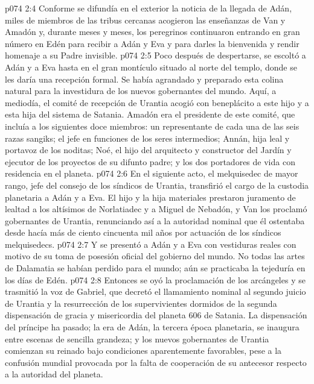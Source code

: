 \vs p074 2:4 \pc Conforme se difundía en el exterior la noticia de la llegada de Adán, miles de miembros de las tribus cercanas acogieron las enseñanzas de Van y Amadón y, durante meses y meses, los peregrinos continuaron entrando en gran número en Edén para recibir a Adán y Eva y para darles la bienvenida y rendir homenaje a su Padre invisible.
\vs p074 2:5 \pc Poco después de despertarse, se escoltó a Adán y a Eva hasta en el gran montículo situado al norte del templo, donde se les daría una recepción formal. Se había agrandado y preparado esta colina natural para la investidura de los nuevos gobernantes del mundo. Aquí, a mediodía, el comité de recepción de Urantia acogió con beneplácito a este hijo y a esta hija del sistema de Satania. Amadón era el presidente de este comité, que incluía a los siguientes doce miembros: un representante de cada una de las seis razas sangiks; el jefe en funciones de los seres intermedios; Annán, hija leal y portavoz de los noditas; Noé, el hijo del arquitecto y constructor del Jardín y ejecutor de los proyectos de su difunto padre; y los dos portadores de vida con residencia en el planeta.
\vs p074 2:6 En el siguiente acto, el melquisedec de mayor rango, jefe del consejo de los síndicos de Urantia, transfirió el cargo de la custodia planetaria a Adán y a Eva. El hijo y la hija materiales prestaron juramento de lealtad a los altísimos de Norlatiadec y a Miguel de Nebadón, y Van los proclamó gobernantes de Urantia, renunciando así a la autoridad nominal que él ostentaba desde hacía más de ciento cincuenta mil años por actuación de los síndicos melquisedecs.
\vs p074 2:7 Y se presentó a Adán y a Eva con vestiduras reales con motivo de su toma de posesión oficial del gobierno del mundo. No todas las artes de Dalamatia se habían perdido para el mundo; aún se practicaba la tejeduría en los días de Edén.
\vs p074 2:8 Entonces se oyó la proclamación de los arcángeles y se trasmitió la voz de Gabriel, que decretó el llamamiento nominal al segundo juicio de Urantia y la resurrección de los supervivientes dormidos de la segunda dispensación de gracia y misericordia del planeta 606 de Satania. La dispensación del príncipe ha pasado; la era de Adán, la tercera época planetaria, se inaugura entre escenas de sencilla grandeza; y los nuevos gobernantes de Urantia comienzan su reinado bajo condiciones aparentemente favorables, pese a la confusión mundial provocada por la falta de cooperación de su antecesor respecto a la autoridad del planeta.
